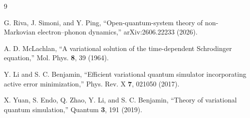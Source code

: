 \documentclass[
  reprint,
  amsmath,
  amssymb,
  aps,
  pra,
  nofootinbib,
  superscriptaddress,
  floatfix
]{revtex4-2}
\begin{document}
\begin{thebibliography}{9}

G. Riva, J. Simoni, and Y. Ping,
``Open-quantum-system theory of non-Markovian electron--phonon dynamics,''
arXiv:2606.22233 (2026).

A. D. McLachlan,
``A variational solution of the time-dependent Schrodinger equation,''
Mol. Phys. \textbf{8}, 39 (1964).

Y. Li and S. C. Benjamin,
``Efficient variational quantum simulator incorporating active error minimization,''
Phys. Rev. X \textbf{7}, 021050 (2017).

X. Yuan, S. Endo, Q. Zhao, Y. Li, and S. C. Benjamin,
``Theory of variational quantum simulation,''
Quantum \textbf{3}, 191 (2019).

\end{thebibliography}
\end{document}
